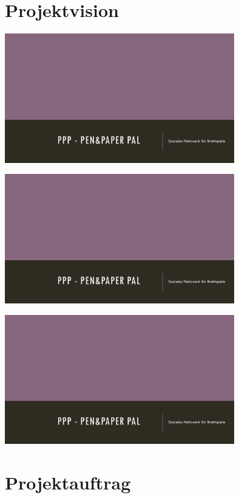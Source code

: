 \documentclass[DIV=13, 10pt,a4paper]{scrartcl}
\begin{document}
\section{Projektvision}
\thispagestyle{empty}
	\begin{flushleft}
		\includegraphics[page=1,width=0.75\textwidth]{docs/0_Sonstiges/PNrot.pdf}
		\vfill
	\end{flushleft}
	\begin{center}
		\includegraphics[page=2,width=0.75\textwidth]{docs/0_Sonstiges/PNrot.pdf}
		\vfill
	\end{center}
	\begin{flushright}
		\includegraphics[page=3,width=0.75\textwidth]{docs/0_Sonstiges/PNrot.pdf}
	\end{flushright}

\section{Projektauftrag}

\newpage
\end{document}
